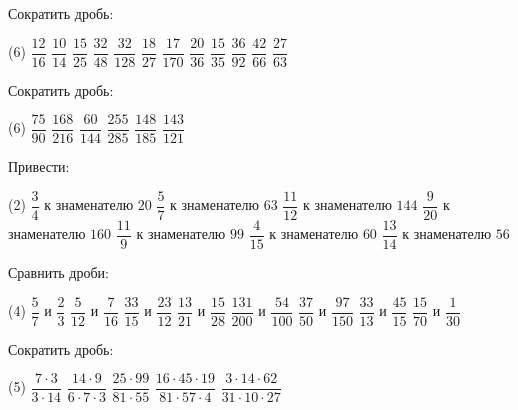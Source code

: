\begin{class}[number=6]
	\begin{listofex}
	\item Сократить дробь:
	\begin{tasks}(6)
		\task \( \dfrac{12}{16} \)
		\task \( \dfrac{10}{14} \)
		\task \( \dfrac{15}{25} \)
		\task \( \dfrac{32}{48} \)
		\task \( \dfrac{32}{128} \)
		\task \( \dfrac{18}{27} \)
		\task \( \dfrac{17}{170} \)
		\task \( \dfrac{20}{36} \)
		\task \( \dfrac{15}{35} \)
		\task \( \dfrac{36}{92} \)
		\task \( \dfrac{42}{66} \)
		\task \( \dfrac{27}{63} \)
	\end{tasks}
	\item Сократить дробь:
	\begin{tasks}(6)
		\task \( \dfrac{75}{90} \)
		\task \( \dfrac{168}{216} \)
		\task \( \dfrac{60}{144} \)
		\task \( \dfrac{255}{285} \)
		\task \( \dfrac{148}{185} \)
		\task \( \dfrac{143}{121} \)
	\end{tasks}
	\item Привести:
	\begin{tasks}(2)
		\task \( \dfrac{3}{4} \) к знаменателю \( 20 \)
		\task \( \dfrac{5}{7} \) к знаменателю \( 63 \)
		\task \( \dfrac{11}{12} \) к знаменателю \( 144 \)
		\task \( \dfrac{9}{20} \) к знаменателю \( 160 \)
		\task \( \dfrac{11}{9} \) к знаменателю \( 99		 \)
		\task \( \dfrac{4}{15} \) к знаменателю \( 60 \)
		\task \( \dfrac{13}{14} \) к знаменателю \( 56 \)
	\end{tasks}
	\item Сравнить дроби:
	\begin{tasks}(4)
		\task \( \dfrac{5}{7} \) и \( \dfrac{2}{3} \)
		\task \( \dfrac{5}{12} \) и \( \dfrac{7}{16} \)
		\task \( \dfrac{33}{15} \) и \( \dfrac{23}{12} \)
		\task \( \dfrac{13}{21} \) и \( \dfrac{15}{28} \)
		\task \( \dfrac{131}{200} \) и \( \dfrac{54}{100} \)
		\task \( \dfrac{37}{50} \) и \( \dfrac{97}{150} \)
		\task \( \dfrac{33}{13} \) и \( \dfrac{45}{15} \)
		\task \( \dfrac{15}{70} \) и \( \dfrac{1}{30} \)
	\end{tasks}
	\item Сократить дробь:
	\begin{tasks}(5)
		\task \( \dfrac{7\cdot3}{3\cdot14} \)
		\task \( \dfrac{14\cdot9}{6\cdot7\cdot3} \)
		\task \( \dfrac{25\cdot99}{81\cdot55} \)
		\task \( \dfrac{16\cdot45\cdot19}{81\cdot57\cdot4} \)
		\task \( \dfrac{3\cdot14\cdot62}{31\cdot10\cdot27} \)
	\end{tasks}
	\end{listofex}
\end{class}

